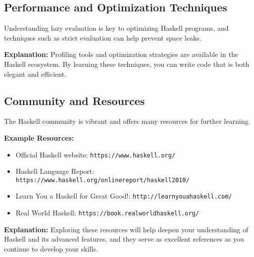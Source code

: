 \documentclass[11pt,a4paper]{article}
\begin{document}
\subsection{Performance and Optimization Techniques}
Understanding lazy evaluation is key to optimizing Haskell programs, and techniques such as strict evaluation can help prevent space leaks.

\textbf{Explanation:}  
Profiling tools and optimization strategies are available in the Haskell ecosystem. By learning these techniques, you can write code that is both elegant and efficient.

\subsection{Community and Resources}
The Haskell community is vibrant and offers many resources for further learning.

\textbf{Example Resources:}
\begin{itemize}[noitemsep]
  \item Official Haskell website: \texttt{https://www.haskell.org/}
  \item Haskell Language Report: \texttt{https://www.haskell.org/onlinereport/haskell2010/}
  \item Learn You a Haskell for Great Good!: \texttt{http://learnyouahaskell.com/}
  \item Real World Haskell: \texttt{https://book.realworldhaskell.org/}
\end{itemize}

\textbf{Explanation:}  
Exploring these resources will help deepen your understanding of Haskell and its advanced features, and they serve as excellent references as you continue to develop your skills.
\end{document}
